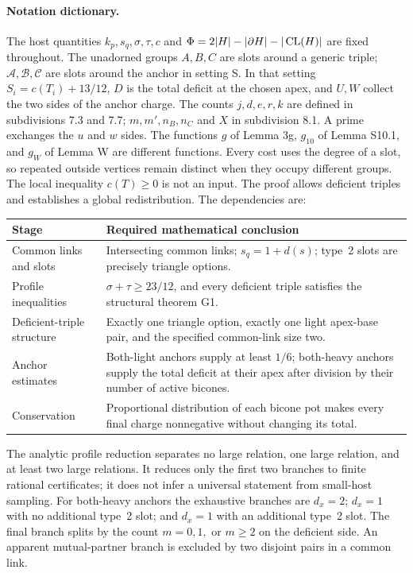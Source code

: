 \paragraph{Notation dictionary.}
The host quantities $k_p,s_q,\sigma,\tau,c$ and $\Phi=2|H|-|\partial H|-|\operatorname{CL}(H)|$ are fixed throughout. The unadorned groups $A,B,C$ are slots around a generic triple; $\mathcal A,\mathcal B,\mathcal C$ are slots around the anchor in setting S. In that setting $S_i=c(T_i)+13/12$, $D$ is the total deficit at the chosen apex, and $U,W$ collect the two sides of the anchor charge. The counts $j,d,e,r,k$ are defined in subdivisions 7.3 and 7.7; $m,m',n_B,n_C$ and $X$ in subdivision 8.1. A prime exchanges the $u$ and $w$ sides. The functions $g$ of Lemma 3g, $g_{10}$ of Lemma S10.1, and $g_W$ of Lemma W are different functions. Every cost uses the degree of a slot, so repeated outside vertices remain distinct when they occupy different groups.
The local inequality $c(T)\geq0$ is not an input. The proof allows deficient triples and establishes a global redistribution. The dependencies are:
\begin{center}
\begin{tabular}{>{\raggedright\arraybackslash}p{.30\linewidth}>{\raggedright\arraybackslash}p{.60\linewidth}}
\toprule
Stage & Required mathematical conclusion\\\midrule
Common links and slots & Intersecting common links; $s_q=1+d(s)$; type~2 slots are precisely triangle options.\\
Profile inequalities & $\sigma+\tau\geq23/12$, and every deficient triple satisfies the structural theorem G1.\\
Deficient-triple structure & Exactly one triangle option, exactly one light apex-base pair, and the specified common-link size two.\\
Anchor estimates & Both-light anchors supply at least $1/6$; both-heavy anchors supply the total deficit at their apex after division by their number of active bicones.\\
Conservation & Proportional distribution of each bicone pot makes every final charge nonnegative without changing its total.\\\bottomrule
\end{tabular}
\end{center}
The analytic profile reduction separates no large relation, one large relation, and at least two large relations. It reduces only the first two branches to finite rational certificates; it does not infer a universal statement from small-host sampling. For both-heavy anchors the exhaustive branches are $d_x=2$; $d_x=1$ with no additional type~2 slot; and $d_x=1$ with an additional type~2 slot. The final branch splits by the count $m=0,1,$ or $m\geq2$ on the deficient side. An apparent mutual-partner branch is excluded by two disjoint pairs in a common link.

